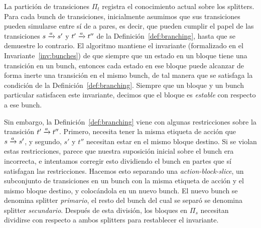 La partición de transiciones $\Pi_t$ registra el conocimiento actual sobre los splitters.
Para cada bunch de transiciones, inicialmente asumimos que sus transiciones pueden simularse entre sí de a pares, es decir, que pueden cumplir el papel de las transiciones $s \pijl{a} s'$ y $t' \pijl{a} t''$ de la Definición~\ref{def:branching}, hasta que se demuestre lo contrario.
El algoritmo mantiene el invariante (formalizado en el Invariante~\ref{inv:bunches}) de que
siempre que un estado en un bloque tiene una transición en un bunch,
entonces cada estado en ese bloque puede alcanzar de forma inerte una transición en el mismo bunch,
de tal manera que se satisfaga la condición de la Definición~\ref{def:branching}.
Siempre que un bloque y un bunch particular satisfacen este invariante, decimos que el bloque es \emph{estable} con respecto a ese bunch.

Sin embargo, la Definición~\ref{def:branching} viene con algunas restricciones sobre la transición $t' \pijl{a} t''$.
Primero, necesita tener la misma etiqueta de acción que $s \pijl{a} s'$,
y segundo, $s'$ y $t''$ necesitan estar en el mismo bloque destino.
Si se violan estas restricciones,
parece que nuestra suposición inicial sobre el bunch era incorrecta,
e intentamos corregir esto dividiendo el bunch en partes
que sí satisfagan las restricciones.
Hacemos esto separando una \emph{action-block-slice}, un subconjunto de transiciones en un bunch con la misma etiqueta de acción y el mismo bloque destino, y colocándola en un nuevo bunch.
El nuevo bunch se denomina splitter \emph{primario},
el resto del bunch del cual se separó se denomina splitter \emph{secundario}.
Después de esta división, los bloques en $\Pi_s$ necesitan dividirse con respecto a ambos splitters para restablecer el invariante.

